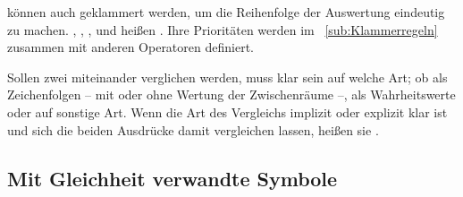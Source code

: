  können auch geklammert werden, um die Reihenfolge der Auswertung eindeutig zu machen.
\symqt{$\metaimp$}, \symqt{$\metarep$}, \symqt{$\metaequiv$}, \symqt{$\metaand$} und \symqt{$\metaoder$} heißen \emph{}.
Ihre Prioritäten werden im \subsectionname~\vref{sub:Klammerregeln} zusammen mit anderen Operatoren definiert.

Sollen zwei  miteinander verglichen werden, muss klar sein auf welche Art; ob \textzB als Zeichenfolgen -- mit oder ohne Wertung der Zwischenräume --, als Wahrheitswerte oder auf sonstige Art.
Wenn die Art des Vergleichs implizit oder explizit klar ist und sich die beiden Ausdrücke damit vergleichen lassen, heißen sie \emph{}.

\subsection{Mit Gleichheit verwandte Symbole}%
\label{sub:Gleichheit}

